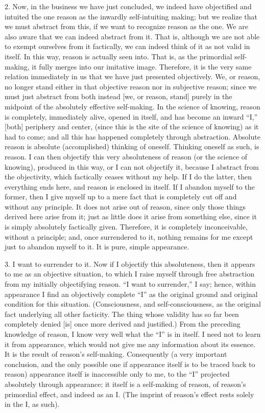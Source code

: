 2. Now, in the business we have just concluded,
we indeed have objectified and intuited the one reason
as the inwardly self-intuiting making;
but we realize that we must abstract from this,
if we want to recognize reason as the one.
We are also aware that we can indeed abstract from it.
That is, although we are not able
to exempt ourselves from it factically,
we can indeed think of it as not valid in itself.
In this way, reason is actually seen into.
That is, as the primordial self-making,
it fully merges into our imitative image.
Therefore, it is the very same relation
immediately in us that we have just presented objectively.
We, or reason, no longer stand
either in that objective reason
nor in subjective reason;
since we must just abstract from both
instead [we, or reason, stand] purely in
the midpoint of the absolutely effective self-making.
In the science of knowing,
reason is completely, immediately alive,
opened in itself,
and has become an inward “I,”
[both] periphery and center,
(since this is the site of the science of knowing)
as it had to come;
and all this has happened completely through abstraction.
Absolute reason is absolute
(accomplished) thinking of oneself.
Thinking oneself as such, is reason.
I can then objectify this
very absoluteness of reason
(or the science of knowing),
produced in this way,
or I can not objectify it,
because I abstract from the objectivity,
which factically ceases without my help.
If I do the latter,
then everything ends here,
and reason is enclosed in itself.
If I abandon myself to the former,
then I give myself up to a mere fact
that is completely cut off
and without any principle.
It does not arise out of reason,
since only those things derived here arise from it;
just as little does it arise from something else,
since it is simply absolutely factically given.
Therefore, it is completely inconceivable,
without a principle;
and, once surrendered to it,
nothing remains for me
except just to abandon myself to it.
It is pure, simple appearance.

3. I want to surrender to it.
Now if I objectify this absoluteness,
then it appears to me as an objective situation,
to which I raise myself through free abstraction
from my initially objectifying reason.
“I want to surrender,”  I say;
hence, within appearance I find
an objectively complete “I”
as the original ground and original condition
for this situation.
(Consciousness, and self-consciousness,
as the original fact underlying all other facticity.
The thing whose validity has so far been completely denied [is]
once more derived and justified.)
From the preceding knowledge of reason,
I know very well what the “I” is in itself.
I need not to learn it from appearance,
which would not give me any information about its essence.
It is the result of reason’s self-making.
Consequently
(a very important conclusion,
and the only possible one if appearance itself is
to be traced back to reason)
appearance itself is inaccessible only to me,
to the “I” projected absolutely through appearance;
it itself is a self-making of reason,
of reason’s primordial effect,
and indeed as an I.
(The imprint of reason’s effect
rests solely in the I, as such).

